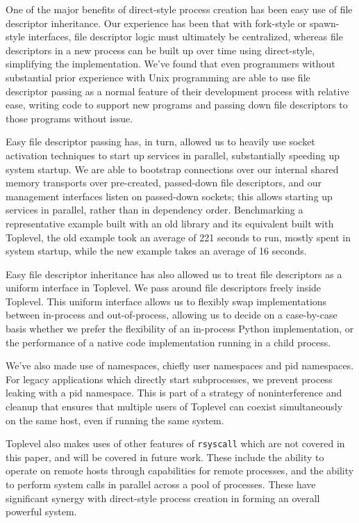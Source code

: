 \documentclass[letterpaper,twocolumn,10pt]{article}
\begin{document}
One of the major benefits of direct-style process creation has been easy use of file descriptor inheritance.
Our experience has been that with fork-style or spawn-style interfaces,
file descriptor logic must ultimately be centralized,
whereas file descriptors in a new process can be built up over time using direct-style,
simplifying the implementation.
We've found that even programmers without substantial prior experience with Unix programming
are able to use file descriptor passing as a normal feature of their development process with relative ease,
writing code to support new programs and passing down file descriptors to those programs without issue.

Easy file descriptor passing has, in turn, allowed us to heavily use socket activation techniques
to start up services in parallel,
substantially speeding up system startup.\cite{socketactivation}
We are able to bootstrap connections over our internal shared memory transports
over pre-created, passed-down file descriptors,
and our management interfaces listen on passed-down sockets;
this allows starting up services in parallel, rather than in dependency order.
Benchmarking a representative example built with an old library
and its equivalent built with Toplevel,
the old example took an average of 221 seconds to run,
mostly spent in system startup,
while the new example takes an average of 16 seconds.

Easy file descriptor inheritance has also allowed us to treat file descriptors as a uniform interface in Toplevel.
We pass around file descriptors freely inside Toplevel.
This uniform interface allows us to flexibly swap implementations between in-process and out-of-process,
allowing us to decide on a case-by-case basis
whether we prefer the flexibility of an in-process Python implementation,
or the performance of a native code implementation running in a child process.

We've also made use of namespaces,
chiefly user namespaces and pid namespaces.
For legacy applications which directly start subprocesses,
we prevent process leaking with a pid namespace.
This is part of a strategy of noninterference and cleanup
that ensures that multiple users of Toplevel
can coexist simultaneously on the same host,
even if running the same system.

Toplevel also makes uses of other features of \texttt{rsyscall} which are not covered in this paper,
and will be covered in future work.
These include the ability to operate on remote hosts through capabilities for remote processes,
and the ability to perform system calls in parallel across a pool of processes.
These have significant synergy with direct-style process creation
in forming an overall powerful system.
\end{document}

